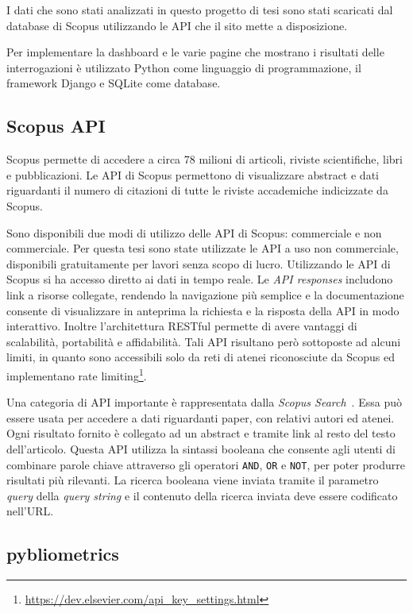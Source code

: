 I dati che sono stati analizzati in questo progetto di tesi sono stati scaricati
dal database di Scopus utilizzando le API che il sito mette a disposizione.

Per implementare la dashboard e le varie pagine che mostrano i risultati delle
interrogazioni è utilizzato Python come linguaggio di programmazione, il
framework Django e SQLite come database.

\subsection{Scopus API}

Scopus permette di accedere a circa 78 milioni di articoli, riviste
scientifiche, libri e pubblicazioni. Le API di Scopus permettono di visualizzare
abstract e dati riguardanti il numero di citazioni di tutte le riviste
accademiche indicizzate da Scopus.

Sono disponibili due modi di utilizzo delle API di Scopus: commerciale e
non commerciale. Per questa tesi sono state utilizzate le API a uso non
commerciale, disponibili gratuitamente per lavori senza scopo di lucro.
Utilizzando le API di Scopus si ha accesso diretto ai dati in tempo
reale. Le \textit{API responses} includono link a risorse collegate, rendendo
la navigazione più semplice e la documentazione consente di visualizzare in
anteprima la richiesta e la risposta della API in modo interattivo. Inoltre
l'architettura RESTful permette di avere vantaggi di scalabilità, portabilità
e affidabilità.
Tali API risultano però sottoposte ad alcuni limiti, in quanto sono accessibili
solo da reti di atenei riconosciute da Scopus ed implementano rate limiting\footnote{\url{https://dev.elsevier.com/api_key_settings.html}}.

Una categoria di API importante è rappresentata dalla \textit{Scopus Search}~\cite{scopussearch}.
Essa può essere usata per accedere a dati riguardanti
paper, con relativi autori ed atenei. Ogni risultato fornito è collegato ad un
abstract e tramite link al resto del testo dell'articolo.
Questa API utilizza la sintassi booleana che consente agli utenti di combinare
parole chiave attraverso gli operatori \texttt{AND}, \texttt{OR} e \texttt{NOT},
per poter produrre risultati  più rilevanti. La ricerca booleana viene inviata
tramite il parametro \textit{query} della \textit{query string} e il contenuto
della ricerca inviata deve essere  codificato nell'URL.

\subsection{pybliometrics}\label{sec:pybliometrics}

